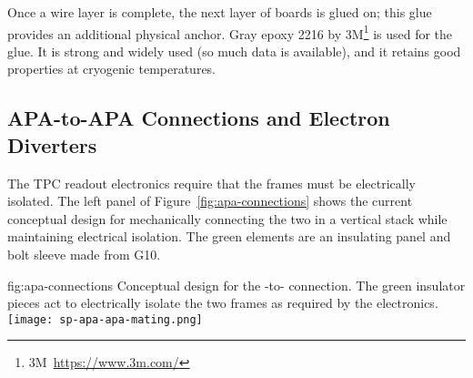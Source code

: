 Once a wire layer is complete, the next layer of boards is glued on; this glue provides an additional physical anchor. Gray epoxy \num{2216} by 3M\footnote{3M\texttrademark ~\url{https://www.3m.com/}} is used for the glue.  It is strong and widely used (so much data is available), and it retains good properties at cryogenic temperatures.  



\subsection{APA-to-APA Connections and Electron Diverters}
\label{sec:fdsp-apa-intfc-apa}

The TPC readout electronics require that the  frames must be electrically isolated.  The left panel of Figure~\ref{fig:apa-connections} shows the current conceptual design for mechanically connecting the two  in a vertical stack while maintaining electrical isolation.  The green elements are an insulating panel and bolt sleeve made from G10. 

\begin{dunefigure}{fig:apa-connections}
{%
Conceptual design for the -to- connection.  The green insulator pieces act to electrically isolate the two frames as required by the  electronics.}  
\texttt{[image: sp-apa-apa-mating.png]} %
\end{dunefigure}

